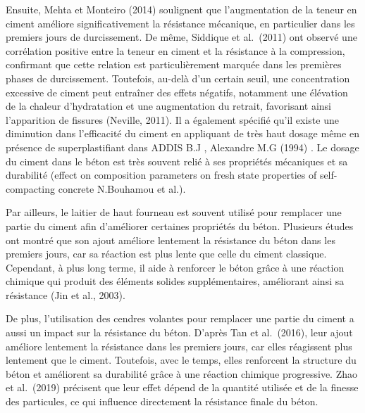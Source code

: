 \documentclass[
  12pt,
]{article}
\begin{document}
Ensuite, Mehta et Monteiro (2014) soulignent que l'augmentation de la
teneur en ciment améliore significativement la résistance mécanique, en
particulier dans les premiers jours de durcissement. De même, Siddique
et al.~(2011) ont observé une corrélation positive entre la teneur en
ciment et la résistance à la compression, confirmant que cette relation
est particulièrement marquée dans les premières phases de durcissement.
Toutefois, au-delà d'un certain seuil, une concentration excessive de
ciment peut entraîner des effets négatifs, notamment une élévation de la
chaleur d'hydratation et une augmentation du retrait, favorisant ainsi
l'apparition de fissures (Neville, 2011). Il a également spécifié qu'il
existe une diminution dans l'efficacité du ciment en appliquant de très
haut dosage même en présence de superplastifiant dans ADDIS B.J ,
Alexandre M.G (1994) . Le dosage du ciment dans le béton est très
souvent relié à ses propriétés mécaniques et sa durabilité (effect on
composition parameters on fresh state properties of self-compacting
concrete N.Bouhamou et al.).

Par ailleurs, le laitier de haut fourneau est souvent utilisé pour
remplacer une partie du ciment afin d'améliorer certaines propriétés du
béton. Plusieurs études ont montré que son ajout améliore lentement la
résistance du béton dans les premiers jours, car sa réaction est plus
lente que celle du ciment classique. Cependant, à plus long terme, il
aide à renforcer le béton grâce à une réaction chimique qui produit des
éléments solides supplémentaires, améliorant ainsi sa résistance (Jin et
al., 2003).

De plus, l'utilisation des cendres volantes pour remplacer une partie du
ciment a aussi un impact sur la résistance du béton. D'après Tan et
al.~(2016), leur ajout améliore lentement la résistance dans les
premiers jours, car elles réagissent plus lentement que le ciment.
Toutefois, avec le temps, elles renforcent la structure du béton et
améliorent sa durabilité grâce à une réaction chimique progressive. Zhao
et al.~(2019) précisent que leur effet dépend de la quantité utilisée et
de la finesse des particules, ce qui influence directement la résistance
finale du béton.
\end{document}
